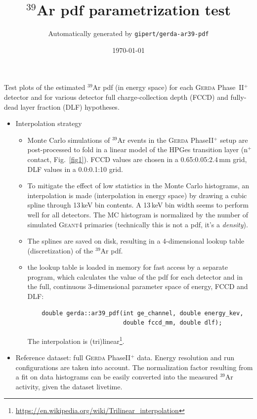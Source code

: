 \documentclass{article}
\title{$^{39}$Ar pdf parametrization test}
\date{\today}
\author{Automatically generated by \texttt{gipert/gerda-ar39-pdf}}
\begin{document}
\maketitle

Test plots of the estimated $^{39}$Ar pdf (in energy space) for each
\textsc{Gerda} Phase~II$^+$ detector and for various detector full
charge-collection depth (FCCD) and fully-dead layer fraction (DLF) hypotheses.

\begin{itemize}
  \item Interpolation strategy
    \begin{itemize}
      \item Monte Carlo simulations of $^{39}$Ar events in the \textsc{Gerda}
        PhaseII$^+$ setup are post-processed to fold in a linear model of the
        HPGes transition layer (n$^+$ contact, Fig.~\ref{fig1}). FCCD values
        are chosen in a 0.65:0.05:2.4\,mm grid, DLF values in a 0.0:0.1:10
        grid.
      \item To mitigate the effect of low statistics in the Monte Carlo
        histograms, an interpolation is made (interpolation in energy space) by
        drawing a cubic spline through 13\,keV bin contents. A 13\,keV bin
        width seems to perform well for all detectors. The MC histogram is
        normalized by the number of simulated \textsc{Geant4} primaries
        (technically this is not a pdf, it's a \emph{density}).
      \item The splines are saved on disk, resulting in a 4-dimensional lookup
        table (discretization) of the $^{39}$Ar pdf.
      \item the lookup table is loaded in memory for fast access by a separate
        program, which calculates the value of the pdf for each detector and in
        the full, continuous 3-dimensional parameter space of energy, FCCD and DLF:
        \begin{verbatim}
    double gerda::ar39_pdf(int ge_channel, double energy_kev,
                           double fccd_mm, double dlf);
        \end{verbatim}
        The interpolation is (tri)linear\footnote{\url{https://en.wikipedia.org/wiki/Trilinear_interpolation}}.
    \end{itemize}
  \item Reference dataset: full \textsc{Gerda} PhaseII$^+$ data. Energy
    resolution and run configurations are taken into account. The normalization
    factor resulting from a fit on data histograms can be easily converted into
    the measured $^{39}$Ar activity, given the dataset livetime.
\end{itemize}
\end{document}
